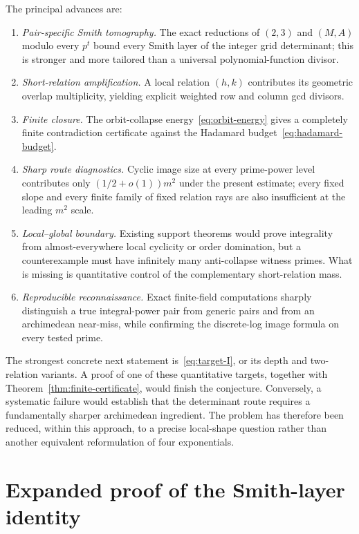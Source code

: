 \documentclass[11pt]{article}
\theoremstyle{definition}
\theoremstyle{remark}
\begin{document}
The principal advances are:
\begin{enumerate}[label=\textup{(\arabic*)}]
\item \emph{Pair-specific Smith tomography.}  The exact reductions of $(2,3)$ and $(M,A)$ modulo every $p^t$ bound every Smith layer of the integer grid determinant; this is stronger and more tailored than a universal polynomial-function divisor.
\item \emph{Short-relation amplification.}  A local relation $(h,k)$ contributes its geometric overlap multiplicity, yielding explicit weighted row and column gcd divisors.
\item \emph{Finite closure.}  The orbit-collapse energy~\eqref{eq:orbit-energy} gives a completely finite contradiction certificate against the Hadamard budget~\eqref{eq:hadamard-budget}.
\item \emph{Sharp route diagnostics.}  Cyclic image size at every prime-power level contributes only $(1/2+o(1))m^2$ under the present estimate; every fixed slope and every finite family of fixed relation rays are also insufficient at the leading $m^2$ scale.
\item \emph{Local--global boundary.}  Existing support theorems would prove integrality from almost-everywhere local cyclicity or order domination, but a counterexample must have infinitely many anti-collapse witness primes.  What is missing is quantitative control of the complementary short-relation mass.
\item \emph{Reproducible reconnaissance.}  Exact finite-field computations sharply distinguish a true integral-power pair from generic pairs and from an archimedean near-miss, while confirming the discrete-log image formula on every tested prime.
\end{enumerate}

The strongest concrete next statement is~\eqref{eq:target-I}, or its depth and two-relation variants.  A proof of one of these quantitative targets, together with Theorem~\ref{thm:finite-certificate}, would finish the conjecture.  Conversely, a systematic failure would establish that the determinant route requires a fundamentally sharper archimedean ingredient.  The problem has therefore been reduced, within this approach, to a precise local-shape question rather than another equivalent reformulation of four exponentials.

\appendix

\section{Expanded proof of the Smith-layer identity}
\label{app:smith}
\end{document}
